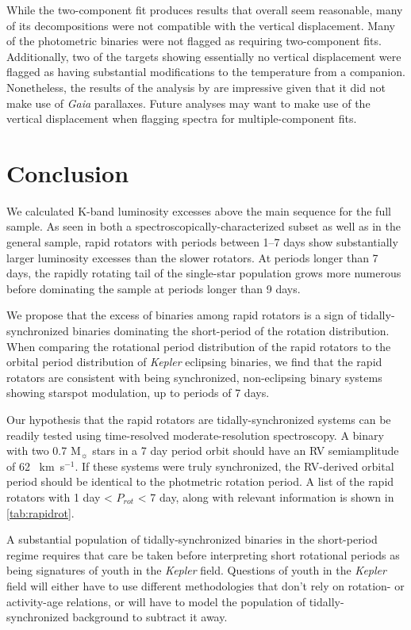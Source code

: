 \documentclass[manuscript]{aastex6}
\newcommand{\Kepler}{\mbox{\textit{Kepler}}}
\newcommand{\Gaia}{\mbox{\textit{Gaia}}}
\newcommand{\kms}{\textrm{~km~s}\ensuremath{^{-1}}}
\begin{document}
While the two-component fit produces results that overall seem reasonable, many
of its decompositions were not compatible with the vertical displacement. Many
of the photometric binaries were not flagged as requiring two-component fits.
Additionally, two of the targets showing essentially no vertical displacement
were flagged as having substantial modifications to the temperature from a
companion. Nonetheless, the results of the analysis by \citet{ElBadry18b} are
impressive given that it did not make use of \Gaia{} parallaxes. Future
analyses may want to make use of the vertical displacement when flagging
spectra for multiple-component fits.

\section{Conclusion}
\label{sec:conclusions}

We calculated K-band luminosity excesses above the main sequence for the full
\citet{McQuillan14} sample. As seen in both a spectroscopically-characterized
subset as well as in the general sample, rapid rotators with periods between
1--7 days show substantially larger luminosity excesses than the slower
rotators. At periods longer than 7 days, the rapidly rotating tail of the
single-star population grows more numerous before dominating the sample at
periods longer than 9 days. 

We propose that the excess of binaries among rapid rotators is a sign of
tidally-synchronized binaries dominating the short-period of the rotation
distribution. When comparing the rotational period distribution of the rapid 
rotators to the orbital period distribution of \Kepler{} eclipsing binaries, we
find that the rapid rotators are consistent with being synchronized, 
non-eclipsing binary systems showing starspot modulation, up to periods of 7
days.



Our hypothesis that the rapid rotators are tidally-synchronized systems can be
readily tested using time-resolved moderate-resolution spectroscopy. A binary
with two 0.7 M\(_\sun\) stars in a 7 day period orbit should have an RV
semiamplitude of 62 \kms. If these systems were truly synchronized, the
RV-derived orbital period should be identical to the photmetric rotation
period. A list of the rapid rotators with 1 day < \(P_{rot}\) < 7 day, along
with relevant information is shown in \cref{tab:rapidrot}.

A substantial population of tidally-synchronized binaries in the short-period 
regime requires that care be taken before interpreting short rotational 
periods as being signatures of youth in the \Kepler{} field. Questions of 
youth in the \Kepler{} field will either have to use different methodologies 
that don't rely on rotation- or activity-age relations, or will have to
model the population of tidally-synchronized background to subtract it away. 
\end{document}
